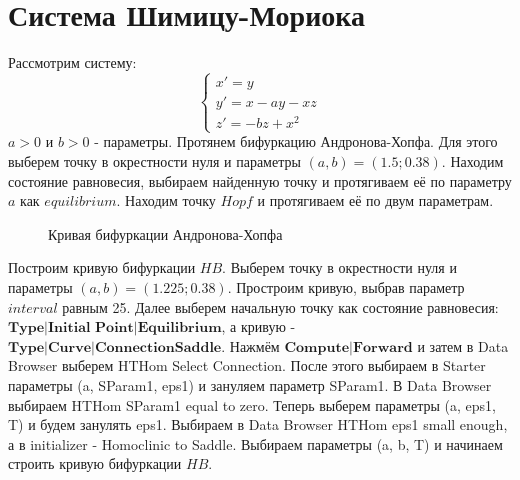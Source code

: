 \documentclass[12pt, a4paper]{article}
\begin{document}
\section{Система Шимицу-Мориока}
Рассмотрим систему:
\begin{equation*}
	\begin{cases}
		x' = y \\
		y' = x - ay - xz \\
		z' = -bz + x^2
	\end{cases}
\end{equation*}
$a > 0$ и $b > 0$ - параметры.
\newline
Протянем бифуркацию Андронова-Хопфа. Для этого выберем точку в окрестности нуля и параметры $(a, b) = (1.5; 0.38)$. Находим состояние равновесия, выбираем найденную точку и протягиваем её по параметру $a$ как $equilibrium$. Находим точку $Hopf$ и протягиваем её по двум параметрам.
\begin{figure}[H]
	\caption{Кривая бифуркации Андронова-Хопфа}
\end{figure}
Построим кривую бифуркации $HB$. Выберем точку в окрестности нуля и параметры $(a, b) = (1.225; 0.38)$. Простроим кривую, выбрав параметр $interval$ равным 25. Далее выберем начальную точку как состояние равновесия: $\textbf{Type|Initial Point|Equilibrium}$, а кривую - $\textbf{Type|Curve|ConnectionSaddle}$. Нажмём $\textbf{Compute|Forward}$ и затем в Data Browser выберем HTHom Select Connection. После этого выбираем в Starter параметры (a, SParam1, eps1) и зануляем параметр SParam1. В Data Browser выбираем HTHom SParam1 equal to zero. Теперь выберем параметры (a, eps1, T) и будем занулять eps1. Выбираем в Data Browser HTHom eps1 small enough, а в initializer - Homoclinic to Saddle. Выбираем параметры (a, b, T) и начинаем строить кривую бифуркации $HB$.
\end{document}
